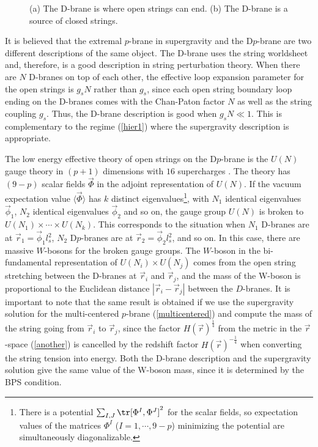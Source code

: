 \begin{figure}[htb]
\begin{center}
\epsfxsize=4.5in\leavevmode{}
\end{center}
\caption{(a) The D-brane is where open strings can end.
(b) The D-brane is a source
of closed strings.}
\label{F9}
\end{figure} 

It is believed that the extremal $p$-brane in supergravity
and the D$p$-brane are two different descriptions of the same
object. The D-brane uses the string worldsheet and, therefore,
is a good description in string perturbation theory. 
When there are $N$ D-branes on top of each other,
the effective loop expansion parameter for the open strings is
$g_s N$ rather than $g_s$, since each open string boundary loop 
ending on the D-branes
comes with the Chan-Paton factor $N$ as well as the
string coupling $g_s$. Thus, the D-brane description
is good when $g_s N \ll 1$. 
This is complementary to the regime (\ref{hier1}) where
the supergravity description is appropriate. 

The low energy effective theory of open strings on 
the D$p$-brane is the $U(N)$ gauge theory in $(p+1)$ dimensions
with $16$ supercharges \cite{Witten:1996im}. 
The theory has $(9-p)$ scalar fields
$\vec{\Phi}$ in the adjoint representation of $U(N)$. 
If the vacuum expectation value $\langle \vec{\Phi} \rangle$ 
has $k$ distinct eigenvalues\footnote{There is a potential
$\sum_{I,J} \tr [\Phi^I, \Phi^J]^2$ for the scalar fields,
so expectation values of the matrices
$\Phi^I$ ($I=1,\cdots,9-p$) minimizing the potential
are simultaneously diagonalizable.}, with $N_1$ identical 
eigenvalues $\vec{\phi}_1$, $N_2$ identical eigenvalues $\vec{\phi}_2$
and so on, the gauge group $U(N)$ is broken 
to $U(N_1) \times \cdots \times U(N_k)$. 
This corresponds to the situation when $N_1$ D-branes are at 
$\vec{r}_1 = \vec{\phi}_1 l_s^2$, $N_2$ D$p$-branes are
at $\vec{r}_2= \vec{\phi}_2 l_s^2$, and so on. 
In this case, there are massive
$W$-bosons for the broken gauge groups. The 
$W$-boson in the bi-fundamental representation of
$U(N_i) \times U(N_j)$ comes from the open string stretching 
between the D-branes at $\vec{r}_i$ and $\vec{r}_j$, 
and the mass of the W-boson
is proportional to the Euclidean distance $|\vec{r}_i - \vec{r}_j|$
between the $D$-branes. It is important to note that the same result 
is obtained if we use the supergravity solution for the multi-centered 
$p$-brane (\ref{multicentered}) and compute the mass of
the string going from $\vec{r}_i$ to $\vec{r}_j$, since
the factor $H(\vec{r})^{\frac{1}{4}}$ from
 the metric in the $\vec{r}$-space (\ref{another})
is cancelled by the redshift factor 
$H(\vec{r})^{-\frac{1}{4}}$ when converting
the string tension into energy. Both
the D-brane description and the supergravity solution give
the same value of the W-boson mass, since it is determined
by the BPS condition. 







